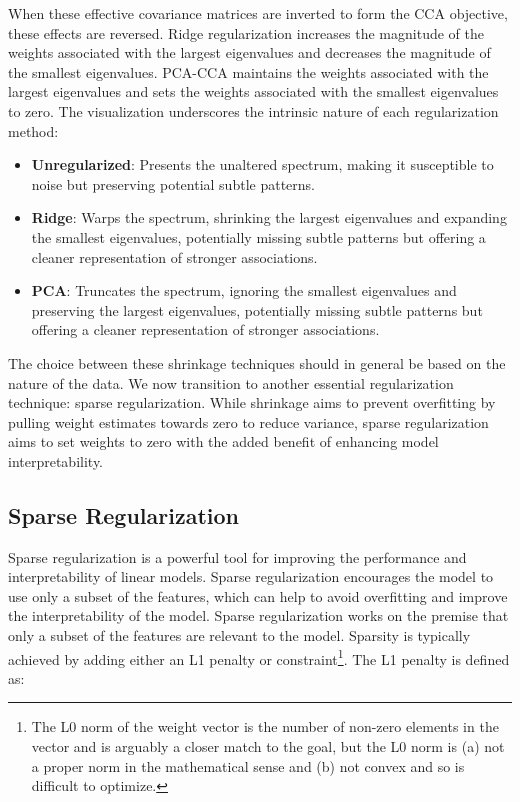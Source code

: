 When these effective covariance matrices are inverted to form the CCA objective, these effects are reversed.
Ridge regularization increases the magnitude of the weights associated with the largest eigenvalues and decreases the magnitude of the smallest eigenvalues.
PCA-CCA maintains the weights associated with the largest eigenvalues and sets the weights associated with the smallest eigenvalues to zero.
The visualization underscores the intrinsic nature of each regularization method:
\begin{itemize}
    \item \textbf{Unregularized}: Presents the unaltered spectrum, making it susceptible to noise but preserving potential subtle patterns.
    \item \textbf{Ridge}: Warps the spectrum, shrinking the largest eigenvalues and expanding the smallest eigenvalues, potentially missing subtle patterns but offering a cleaner representation of stronger associations.
    \item \textbf{PCA}: Truncates the spectrum, ignoring the smallest eigenvalues and preserving the largest eigenvalues, potentially missing subtle patterns but offering a cleaner representation of stronger associations.
\end{itemize}
The choice between these shrinkage techniques should in general be based on the nature of the data.
We now transition to another essential regularization technique: sparse regularization.
While shrinkage aims to prevent overfitting by pulling weight estimates towards zero to reduce variance, sparse regularization aims to set \gls{weights} to zero with the added benefit of enhancing model interpretability.

\subsection{Sparse Regularization}

Sparse regularization is a powerful tool for improving the performance and interpretability of linear models.
Sparse regularization encourages the model to use only a subset of the features, which can help to avoid overfitting and improve the interpretability of the model.
Sparse regularization works on the premise that only a subset of the features are relevant to the model.
Sparsity is typically achieved by adding either an L1 penalty or constraint\footnote{The L0 norm of the weight vector is the number of non-zero elements in the vector and is arguably a closer match to the goal, but the L0 norm is (a) not a proper norm in the mathematical sense and (b) not convex and so is difficult to optimize.}.
The L1 penalty is defined as:

